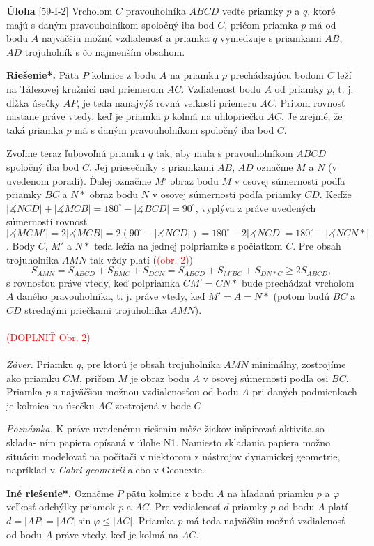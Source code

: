 \documentclass{article}
\newcommand{\rieh}{\textbf{Riešenie*.} }
\newcommand{\ma}{\measuredangle}
\newcommand\todo[1]{\noindent\textcolor{red}{(#1)}}
\newcommand{\problem}[4]{
  \begin{tcolorbox}[breakable,notitle,boxrule=0pt,colback=light-gray,colframe=light-gray]
    \textbf{Úloha}
    [#1] #3
  \end{tcolorbox}
  \noindent#4
}
\begin{document}
\problem{59-I-2}{}{
Vrcholom $C$ pravouholníka $ABCD$ veďte priamky $p$ a $q$, ktoré majú s daným pravouholníkom spoločný iba bod $C$, pričom priamka $p$ má od bodu $A$ najväčšiu možnú
vzdialenosť a priamka $q$ vymedzuje s priamkami $AB$, $AD$ trojuholník s čo najmenším obsahom.
}{
\rieh Päta $P$ kolmice z bodu $A$ na priamku $p$ prechádzajúcu bodom $C$ leží na
Tálesovej kružnici nad priemerom $AC$. Vzdialenosť bodu $A$ od priamky $p$, t. j. dĺžka úsečky $AP$, je teda nanajvýš rovná veľkosti priemeru $AC$. Pritom rovnosť nastane práve vtedy, keď je priamka $p$ kolmá na uhlopriečku $AC$. Je zrejmé, že taká priamka $p$ má s daným pravouholníkom spoločný iba bod $C$.

Zvoľme teraz ľubovoľnú priamku $q$ tak, aby mala s pravouholníkom $ABCD$ spoločný iba bod $C$. Jej priesečníky s priamkami $AB$, $AD$ označme $M$ a $N$ (v uvedenom poradí). Ďalej označme $M'$ obraz bodu $M$ v osovej súmernosti podľa priamky $BC$ a $N*$ obraz bodu $N$ v osovej súmernosti podľa priamky $CD$. Keďže $|\ma NCD| + |\ma MCB|= 180^\circ- |\ma BCD| = 90^\circ$, vyplýva z práve uvedených súmerností rovnosť $|\ma MCM'| = 2|\ma MCB| = 2(90^\circ - |\ma NCD|) = 180^\circ - 2|\ma NCD| = 180^\circ - |\ma NCN* |$. Body $C$, $M'$ a $N*$ teda ležia na jednej polpriamke s počiatkom $C$. Pre obsah trojuholníka $AMN$
tak vždy platí (\todo{obr. 2})
$$S_{AMN}= S_{ABCD} + S_{BMC} + S_{DCN} = S_{ABCD} + S_{M'BC} + S_{DN*C} \geq 2S_{ABCD},$$
s rovnosťou práve vtedy, keď polpriamka $CM'= CN*$ bude prechádzať vrcholom $A$ daného pravouholníka, t. j. práve vtedy, keď $M'= A = N*$ (potom budú $BC$ a $CD$ strednými priečkami trojuholníka $AMN$).\\
\\
\todo{DOPLNIŤ Obr. 2}\\
\\
\textit{Záver.} Priamku $q$, pre ktorú je obsah trojuholníka $AMN$ minimálny, zostrojíme
ako priamku $CM$, pričom $M$ je obraz bodu $A$ v osovej súmernosti podľa osi $BC$.
Priamka $p$ s najväčšou možnou vzdialenosťou od bodu $A$ pri daných podmienkach
je kolmica na úsečku $AC$ zostrojená v bode $C$

\textit{Poznámka.} K práve uvedenému riešeniu môže žiakov inšpirovať aktivita so sklada-
ním papiera opísaná v úlohe N1. Namiesto skladania papiera možno situáciu modelovať
na počítači v niektorom z nástrojov dynamickej geometrie, napríklad v \textit{Cabri geometrii} alebo v {Geonexte}.

\textbf{Iné riešenie*.} Označme $P$ pätu kolmice z bodu $A$ na hľadanú priamku $p$ a $\varphi$ veľkosť odchýlky priamok $p$ a $AC$. Pre vzdialenosť $d$ priamky $p$ od bodu $A$ platí $d = |AP| = |AC| \sin \varphi \leq |AC|$. Priamka $p$ má teda najväčšiu možnú vzdialenosť od bodu $A$ práve vtedy, keď je kolmá na $AC$.

}
\end{document}
